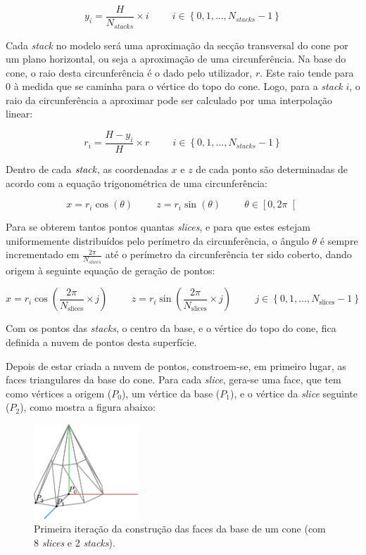 \documentclass[12pt, a4paper]{article}
\begin{document}
$$
y_i = \frac{H}{N_{stacks}} \times i
\hspace{1cm}
i \in \left \lbrace 0, 1, \ldots, N_{stacks} - 1 \right \rbrace
$$

Cada \emph{stack} no modelo será uma aproximação da secção transversal do cone por um plano
horizontal, ou seja a aproximação de uma circunferência. Na base do cone, o raio desta
circunferência é o dado pelo utilizador, $r$. Este raio tende para 0 à medida que se caminha para
o vértice do topo do cone. Logo, para a \emph{stack} $i$, o raio da circunferência a aproximar
pode ser calculado por uma interpolação linear:

$$
r_i = \frac{H - y_i}{H}\times r
\hspace{1cm}
i \in \left \lbrace 0, 1, \ldots, N_{stacks} - 1 \right \rbrace
$$

Dentro de cada $\emph{stack}$, as coordenadas $x$ e $z$ de cada ponto são determinadas de acordo
com a equação trigonométrica de uma circunferência:

$$
x = r_i \cos(\theta)
\hspace{1cm}
z = r_i \sin(\theta)
\hspace{1cm}
\theta \in \left [ 0, 2 \pi \right [
$$

Para se obterem tantos pontos quantas \emph{slices}, e para que estes estejam uniformemente
distribuídos pelo perímetro da circunferência, o ângulo $\theta$ é sempre incrementado em
$\frac{2 \pi}{N_{slices}}$ até o perímetro da circunferência ter sido coberto, dando origem à
seguinte equação de geração de pontos:

$$
x = r_i \cos \left ( \frac{2 \pi}{N_\text{slices}} \times j \right )
\hspace{1cm}
z = r_i \sin \left ( \frac{2 \pi}{N_\text{slices}} \times j \right )
\hspace{1cm}
j \in \left \lbrace 0, 1, \ldots, N_\text{slices} - 1 \right \rbrace
$$

Com os pontos das \emph{stacks}, o centro da base, e o vértice do topo do cone, fica definida a
nuvem de pontos desta superfície.

Depois de estar criada a nuvem de pontos, constroem-se, em primeiro lugar, as faces triangulares da
base do cone. Para cada \emph{slice}, gera-se uma face, que tem  como vértices a origem ($P_0$), um
vértice da base ($P_1$), e o vértice da \emph{slice} seguinte ($P_2$), como mostra a figura abaixo:

\begin{figure}[H]
    \centering
    \includegraphics[width=0.35\textwidth]{res/phase1/figures/Cone3.pdf}
    \caption{
        \onehalfspacing
        Primeira iteração da construção das faces da base de um cone (com 8 \emph{slices} e 2
        \emph{stacks}).
    }
\end{figure}
\end{document}
